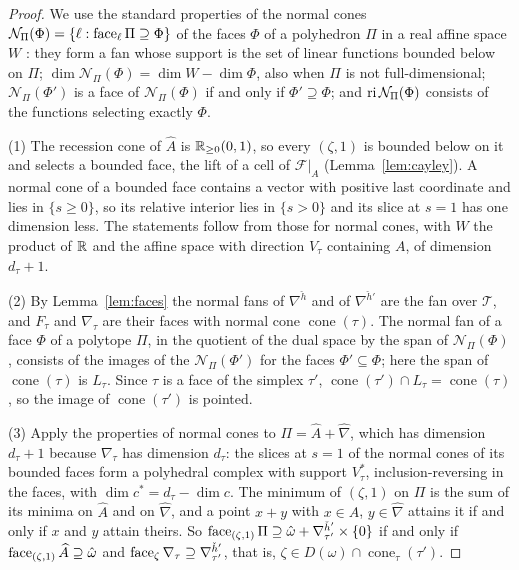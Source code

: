 \begin{proof}
We use the standard properties of the normal cones $\mathcal N_\Pi(\Phi)=\{\ell:\operatorname{face}_\ell\Pi\supseteq\Phi\}$ of the
faces $\Phi$ of a polyhedron $\Pi$ in a real affine space $W$ \cite[Lecture~7]{Ziegler}: they form a fan whose support is
the set of linear functions bounded below on $\Pi$; $\dim\mathcal N_\Pi(\Phi)=\dim W-\dim\Phi$, also when $\Pi$ is not
full-dimensional; $\mathcal N_\Pi(\Phi')$ is a face of $\mathcal N_\Pi(\Phi)$ if and only if $\Phi'\supseteq\Phi$; and
$\operatorname{ri}\mathcal N_\Pi(\Phi)$ consists of the functions selecting exactly $\Phi$.

(1) The recession cone of $\widehat A$ is $\mathbb R_{\ge0}(0,1)$, so every $(\zeta,1)$ is bounded below on it and selects a bounded
face, the lift of a cell of $\mathcal F|_A$ (Lemma~\ref{lem:cayley}). A normal cone of a bounded face contains a vector with
positive last coordinate and lies in $\{s\ge0\}$, so its relative interior lies in $\{s>0\}$ and its slice at $s=1$ has one
dimension less. The statements follow from those for normal cones, with $W$ the product of $\mathbb R$ and the affine space with
direction $V_\tau$ containing $A$, of dimension $d_\tau+1$.

(2) By Lemma~\ref{lem:faces} the normal fans of $\nabla^{\check h}$ and of $\nabla^{\check h'}$ are the fan over $\mathcal T$,
and $F_\tau$ and $\nabla_\tau$ are their faces with normal cone $\operatorname{cone}(\tau)$. The normal fan of a face $\Phi$ of
a polytope $\Pi$, in the quotient of the dual space by the span of $\mathcal N_\Pi(\Phi)$, consists of the images of the
$\mathcal N_\Pi(\Phi')$ for the faces $\Phi'\subseteq\Phi$; here the span of $\operatorname{cone}(\tau)$ is $L_\tau$. Since
$\tau$ is a face of the simplex $\tau'$, $\operatorname{cone}(\tau')\cap L_\tau=\operatorname{cone}(\tau)$, so the image of
$\operatorname{cone}(\tau')$ is pointed.

(3) Apply the properties of normal cones to $\Pi=\widehat A+\widehat\nabla$, which has dimension $d_\tau+1$ because
$\nabla_\tau$ has dimension $d_\tau$: the slices at $s=1$ of the normal cones of its bounded faces form a polyhedral complex
with support $V_\tau^*$, inclusion-reversing in the faces, with $\dim c^*=d_\tau-\dim c$. The minimum of $(\zeta,1)$ on $\Pi$
is the sum of its minima on $\widehat A$ and on $\widehat\nabla$, and a point $x+y$ with $x\in\widehat A$,
$y\in\widehat\nabla$ attains it if and only if $x$ and $y$ attain theirs. So $\operatorname{face}_{(\zeta,1)}\Pi\supseteq\hat\omega+
\nabla^{\check h'}_{\tau'}\times\{0\}$ if and only if $\operatorname{face}_{(\zeta,1)}\widehat A\supseteq\hat\omega$ and
$\operatorname{face}_\zeta\nabla_\tau\supseteq\nabla^{\check h'}_{\tau'}$, that is, $\zeta\in D(\omega)\cap\operatorname{cone}_\tau(\tau')$.


\end{proof}
